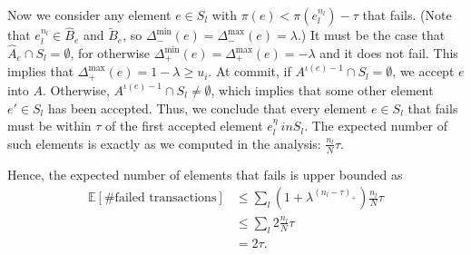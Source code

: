 Now we consider any element $e \in S_l$ with $\pi(e) < \pi(e_l^{n_l}) - \tau$ that fails.
(Note that $e_l^{n_l} \in \hat{B}_e$ and $\tilde{B}_e$, so $\Delta_-^{\min}(e) = \Delta_-^{\max}(e) = \lambda$.)
It must be the case that $\hat{A}_e \cap S_l = \emptyset$, for otherwise $\Delta_+^{\min}(e) = \Delta_+^{\max}(e) = -\lambda$ and it does not fail.
This implies that $\Delta_+^{\max}(e) = 1-\lambda \geq u_i$.
At commit, if $A^{\iota(e)-1} \cap S_l = \emptyset$, we accept $e$ into $A$.
Otherwise, $A^{\iota(e)-1} \cap S_l \neq \emptyset$, which implies that some other element $e' \in S_l$ has been accepted.
Thus, we conclude that every element $e\in S_l$ that fails must be within $\tau$ of the first accepted element $e_l^\eta \ in S_l$.
The expected number of such elements is exactly as we computed in the \hogwild analysis: $\frac{n_l}{N}\tau$.

Hence, the expected number of elements that fails is upper bounded as
\begin{align*}
\mathbb{E}[\#\text{failed transactions}]
&\leq \sum_l (1+\lambda^{(n_l-\tau)_+}) \frac{n_l}{N} \tau\\
&\leq \sum_l 2\frac{n_l}{N} \tau\\
&= 2\tau.
\end{align*}




